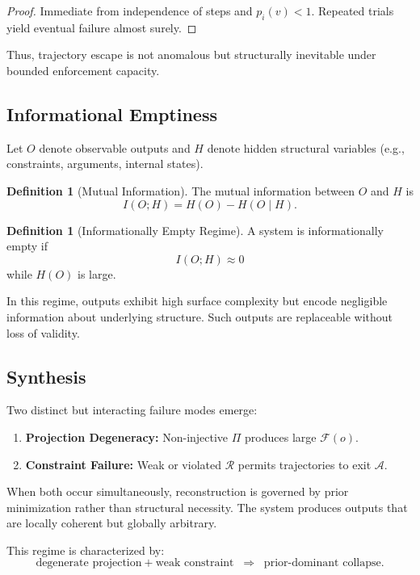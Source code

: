 \documentclass[12pt, oneside]{article}
\theoremstyle{plain}
\theoremstyle{definition}
\newtheorem{definition}[theorem]{Definition}
\theoremstyle{remark}
\begin{document}
\begin{proof}
Immediate from independence of steps and $p_i(v) < 1$. Repeated trials yield eventual failure almost surely.
\end{proof}

Thus, trajectory escape is not anomalous but structurally inevitable under bounded enforcement capacity.

\subsection{Informational Emptiness}

Let $O$ denote observable outputs and $H$ denote hidden structural variables (e.g., constraints, arguments, internal states).

\begin{definition}[Mutual Information]
The mutual information between $O$ and $H$ is
\[
I(O;H) = H(O) - H(O \mid H).
\]
\end{definition}

\begin{definition}[Informationally Empty Regime]
A system is informationally empty if
\[
I(O;H) \approx 0
\]
while $H(O)$ is large.
\end{definition}

In this regime, outputs exhibit high surface complexity but encode negligible information about underlying structure. Such outputs are replaceable without loss of validity.

\subsection{Synthesis}

Two distinct but interacting failure modes emerge:

\begin{enumerate}
\item \textbf{Projection Degeneracy:} Non-injective $\Pi$ produces large $\mathcal{F}(o)$.
\item \textbf{Constraint Failure:} Weak or violated $\mathcal{R}$ permits trajectories to exit $\mathcal{A}$.
\end{enumerate}

When both occur simultaneously, reconstruction is governed by prior minimization rather than structural necessity. The system produces outputs that are locally coherent but globally arbitrary.

This regime is characterized by:
\[
\text{degenerate projection} + \text{weak constraint} \;\;\Rightarrow\;\; \text{prior-dominant collapse}.
\]
\end{document}
